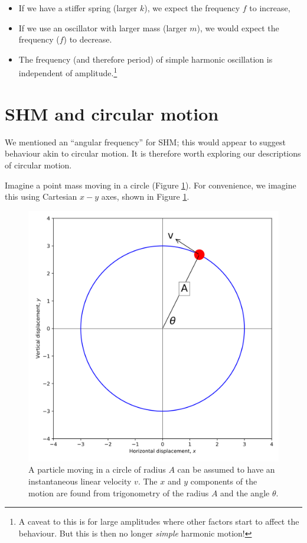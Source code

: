\documentclass[
]{book}
\providecommand{\tightlist}{%
  \setlength{\itemsep}{0pt}\setlength{\parskip}{0pt}}
\begin{document}
\begin{itemize}
\tightlist
\item
  If we have a stiffer spring (larger \(k\)), we expect the frequency \(f\) to increase,
\item
  If we use an oscillator with larger mass (larger \(m\)), we would expect the frequency (\(f\)) to decrease.
\item
  The frequency (and therefore period) of simple harmonic oscillation is independent of amplitude.\footnote{A caveat to this is for large amplitudes where other factors start to affect the behaviour. But this is then no longer \emph{simple} harmonic motion!}
\end{itemize}

\hypertarget{sec:ch1-shmcircmotion1}{%
\section{SHM and circular motion}\label{sec:ch1-shmcircmotion1}}

We mentioned an ``angular frequency'' for SHM; this would appear to suggest behaviour akin to circular motion. It is therefore worth exploring our descriptions of circular motion.

Imagine a point mass moving in a circle (Figure \ref{fig:ch1-circularmotion1}). For convenience, we imagine this using Cartesian \(x-y\) axes, shown in Figure \ref{fig:ch1-circularmotion1}.

\begin{figure}

{\centering \includegraphics[width=0.7\linewidth]{visualisations/ch1-shmcircular} 

}

\caption{A particle moving in a circle of radius $A$ can be assumed to have an instantaneous linear velocity $v$. The $x$ and $y$ components of the motion are found from trigonometry of the radius $A$ and the angle $θ$.}\label{fig:ch1-circularmotion1}
\end{figure}
\end{document}
